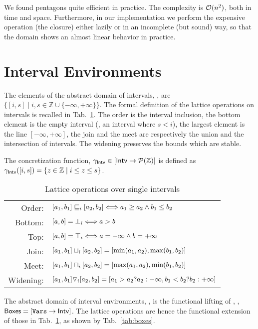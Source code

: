 \documentclass{sig-alternate}
\begin{document}
We found pentagons quite efficient in practice. 
The complexity is $\mathcal{O}(n^2)$, both in time and space.
Furthermore, in our implementation we perform the expensive operation
(the closure) either lazily or in an incomplete (but sound) way, so
that the domain shows an almost linear behavior in practice.

\section{Interval Environments}
The elements of the abstract domain of intervals, \Intervals, are $\{ [i, s] \mid i,s \in \mathbb{Z} \cup \{-\infty, + \infty\} \}$.
The formal definition of the lattice operations on intervals is recalled in Tab.~\ref{tab:intervals}.
The order is the interval inclusion, the bottom  element is the empty interval (\ie, an interval where $s < i$), the largest element is the line $[-\infty, +\infty]$, the join and the meet are respectively the union and the intersection of intervals.
The widening preserves the bounds which are stable. 

The concretization function, $\gamma_{\mathsf{Intv}} \in [\mathsf{Intv} \rightarrow\mathcal{P}{(\mathbb{Z})}]$ is defined as $\gamma_{\mathsf{Intv}}([i, s]) = \{ z \in \mathbb{Z} \mid i \leq z \leq s\}$.

\begin{table}[t]
\small
\begin{tabular}{rl}
Order:& $[a_1, b_1] \sqsubseteq_i [a_2, b_2] \Longleftrightarrow a_1 \geq a_2 \wedge b_1 \leq b_2$ \\
Bottom:& $ [a, b] = {\bot}_i \Longleftrightarrow a > b$ \\
Top:& $[a, b] = {\top}_i \Longleftrightarrow a = -\infty \wedge b = +\infty$\\
Join:& $[a_1, b_1] \sqcup_i [a_2, b_2] = [\mathrm{min}(a_1, a_2), \mathrm{max}(b_1, b_2)]$ \\
Meet:& $[a_1, b_1] \sqcap_i [a_2, b_2] = [\mathrm{max}(a_1, a_2), \mathrm{min}(b_1, b_2)]$ \\
Widening:& $[a_1, b_1] \triangledown_i [a_2, b_2] = [a_1 > a_2 ? a_2 : -\infty, b_1 < b_2 ? b_2 : +\infty]$ \\
\end{tabular}
\caption{Lattice operations over single intervals}
\label{tab:intervals}
\end{table}

The abstract domain of interval environments, \Boxes, is the functional lifting of \Intervals, \ie, $\mathsf{Boxes} =  [\mathtt{Vars} \rightarrow\mathsf{Intv}]$.
The lattice operations are hence the functional extension of those in Tab.~\ref{tab:intervals}, as shown by Tab.~\ref{tab:boxes}.
\end{document}
